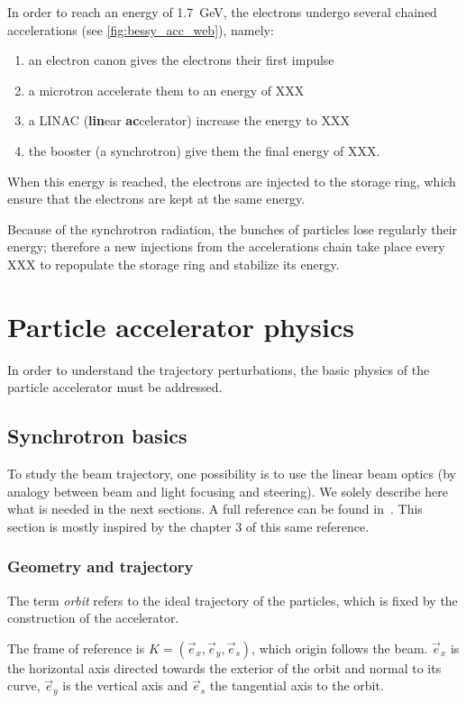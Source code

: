 In order to reach an energy of 1.7~GeV, the electrons undergo several chained accelerations (see \autoref{fig:bessy_acc_web}), namely:
\begin{enumerate}
    \item an electron canon gives the electrons their first impulse
    \item a microtron accelerate them to an energy of XXX
    \item a LINAC (\textbf{lin}ear \textbf{ac}celerator) increase the energy to XXX
    \item the booster (a synchrotron) give them the final energy of XXX.
\end{enumerate}

When this energy is reached, the electrons are injected to the storage ring, which ensure that the electrons are kept at the same energy.

Because of the synchrotron radiation, the bunches of particles lose regularly their energy; therefore a new injections from the accelerations chain take place every XXX to repopulate the storage ring and stabilize its energy.

\section{Particle accelerator physics}
In order to understand the trajectory perturbations, the basic physics of the particle accelerator must be addressed.

\subsection{Synchrotron basics}
To study the beam trajectory, one possibility is to use the linear beam optics (by analogy between beam and light focusing and steering). We solely describe here what is needed in the next sections. A full reference can be found in~\cite{book:wille}. This section is mostly inspired by the chapter 3 of this same reference.

\subsubsection{Geometry and trajectory}
The term \emph{orbit} refers to the ideal trajectory of the particles, which is fixed by the construction of the accelerator.

The frame of reference is $K=(\vec{e}_x,\vec{e}_y, \vec{e}_s)$, which origin follows the beam. $\vec{e}_x$ is the horizontal axis directed towards the exterior of the orbit and normal to its curve, $\vec{e}_y$ is the vertical axis and $\vec{e}_s$ the tangential axis to the orbit.


